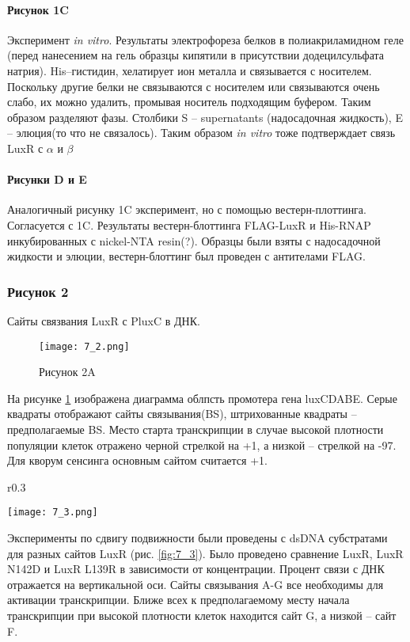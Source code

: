 \paragraph{Рисунок 1C}
Эксперимент \textit{in vitro}.
Результаты электрофореза белков в полиакриламидном геле (перед нанесением на гель образцы кипятили в присутствии додецилсульфата натрия). His--гистидин,  хелатирует ион металла и связывается с носителем. Поскольку другие белки не связываются с носителем или связываются очень слабо, их можно удалить, промывая носитель подходящим буфером. Таким образом разделяют фазы. Столбики S -- supernatants (надосадочная жидкость), E -- элюция(то что не связалось). Таким образом \textit{in vitro} тоже подтверждает связь LuxR с $\alpha$ и $\beta$

\paragraph{Рисунки D и E}
Аналогичный рисунку 1C эксперимент, но с помощью вестерн-плоттинга. Согласуется с 1C. 
Результаты вестерн-блоттинга FLAG-LuxR и His-RNAP инкубированных с nickel-NTA resin(?). Образцы были взяты с надосадочной жидкости и элюции, вестерн-блоттинг был проведен с антителами FLAG. 

\subsubsection{Рисунок 2}
Сайты связвания LuxR с PluxC в ДНК.
\begin{figure}[h]
    \centering
    \texttt{[image: 7\_2.png]}
    \caption{Рисунок 2A}
    \label{fig:7_2}
\end{figure}

На рисунке \ref{fig:7_2} изображена диаграмма облпсть промотера гена luxCDABE. Серые квадраты отображают сайты связывания(BS), штрихованные квадраты -- предполагаемые BS. Место старта транскрипции в случае высокой плотности популяции клеток отражено черной стрелкой на +1, а низкой -- стрелкой на -97. Для кворум сенсинга основным сайтом считается +1.

\begin{wrapfigure}{r}{0.3\textwidth}
  \begin{center}
    \texttt{[image: 7\_3.png]}
  \end{center}
  \caption{Рисунок 2B, C, D}
  \label{fig:7_3}
\end{wrapfigure}
Эксперименты по сдвигу подвижности были проведены с dsDNA субстратами для разных сайтов LuxR (рис. \ref{fig:7_3}). Было проведено сравнение LuxR, LuxR N142D и LuxR L139R в зависимости от концентрации. Процент связи с ДНК отражается на вертикальной оси.
Сайты связывания A-G все необходимы для активации транскрипции. Ближе всех к предполагаемому месту начала транскрипции при высокой плотности клеток находится сайт G, а низкой -- сайт F. 

